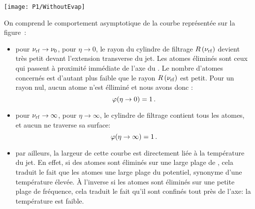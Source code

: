 \bfighss
\texttt{[image: P1/WithoutEvap]}
\label{fig:SpectreEvap}
\efigh

{
On comprend le comportement asymptotique de la courbe représentée sur la figure~:
\begin{itemize}
	\item pour ${\nu_{\rm rf}} \rightarrow \nu_0$, \cad pour $\eta \rightarrow 0$, le rayon du cylindre de filtrage ${R\left( {\nu_{\rm rf}} \right)}$ devient très petit devant l'extension transverse du jet. Les atomes éliminés sont ceux qui passent à proximité immédiate de l'axe du \gm. Le nombre d'atomes concernés est d'autant plus faible que le rayon ${R\left( {\nu_{\rm rf}} \right)}$ est petit. Pour un rayon nul, aucun atome n'est élliminé et nous avons donc :
	\[ 
	{\varphi}(\eta \rightarrow 0) = 1 
	\, .
	\]
	\item pour ${\nu_{\rm rf}} \rightarrow \infty$, \cad pour $\eta \rightarrow \infty$, le cylindre de filtrage contient tous les atomes, et aucun ne traverse sa surface:%
	\[ 
	{\varphi}(\eta \rightarrow \infty) = 1 
	\, . 
	\]
	\item par ailleurs, la largeur de cette courbe est directement liée à la température du jet. En effet, si des atomes sont éliminés sur une large plage de \rf, cela traduit le fait que les atomes  une large plage du potentiel, synonyme d'une température élevée. \`A l'inverse si les atomes sont éliminés sur une petite plage de fréquence, cela traduit le fait qu'il sont confinés tout près de l'axe: la température est faible.
\end{itemize}
}

\casse

